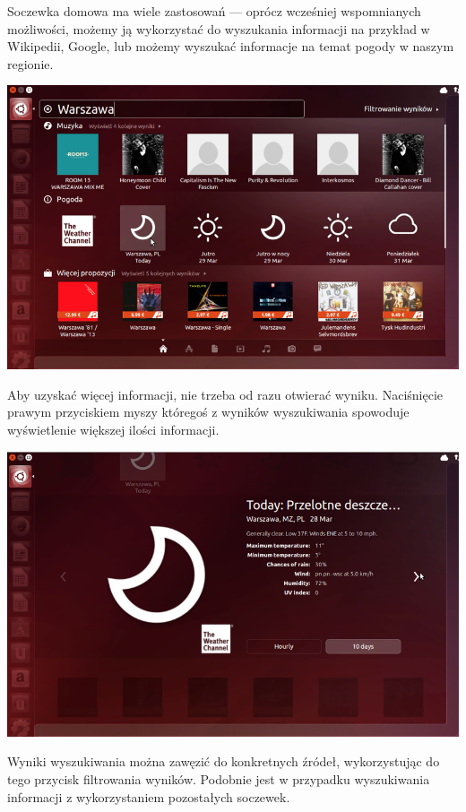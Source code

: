 Soczewka domowa ma wiele zastosowań --- oprócz wcześniej wspomnianych możliwości, możemy ją wykorzystać do wyszukania informacji na przykład w Wikipedii, Google, lub możemy wyszukać informacje na temat pogody w naszym regionie.
\clearpage
\begin{center}
	\includegraphics[width=\linewidth]{images/unity_dash_wyszukiwanie.png}
\end{center}

Aby uzyskać więcej informacji, nie trzeba od razu otwierać wyniku. Naciśnięcie prawym przyciskiem myszy któregoś z wyników wyszukiwania spowoduje wyświetlenie większej ilości informacji.

\begin{center}
	\includegraphics[width=\linewidth]{images/unity_dash_wyszukiwanie2.png}
\end{center}

Wyniki wyszukiwania można zawęzić do konkretnych źródeł, wykorzystując do tego przycisk filtrowania wyników. Podobnie jest w przypadku wyszukiwania informacji z wykorzystaniem pozostałych soczewek.


